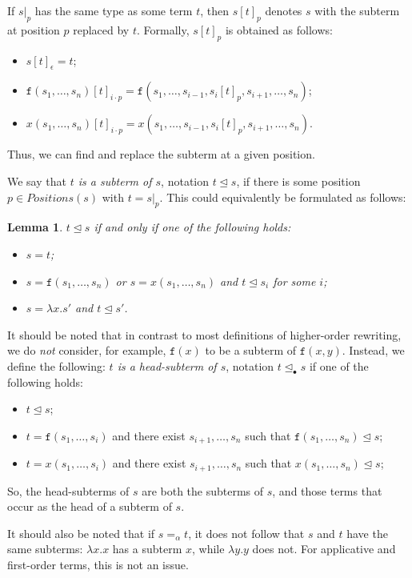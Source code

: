 \documentclass{lmcs}
\theoremstyle{theorem}\newtheorem{theorem}{Theorem}
\theoremstyle{theorem}\newtheorem{lemma}[theorem]{Lemma}
\theoremstyle{theorem}\newtheorem{corollary}[theorem]{Corollary}
\theoremstyle{definition}\newtheorem{definition}[theorem]{Definition}
\theoremstyle{definition}\newtheorem{example}[theorem]{Example}
\newcommand{\Positions}{\mathit{Positions}}
\newcommand{\identifier}[1]{\mathtt{#1}}
\newcommand{\afun}{\identifier{f}}
\newcommand{\avar}{x}
\newcommand{\abs}[2]{\lambda #1.#2}
\newcommand{\subtermeq}{\unlhd}
\newcommand{\headsubtermeq}{\unlhd_{\bullet}}
\begin{document}
If $s|_p$ has the same type as some term $t$, then $s[t]_p$ denotes $s$ with the subterm at position
$p$ replaced by $t$.  Formally, $s[t]_p$ is obtained as follows:
\begin{itemize}
\item $s[t]_\epsilon = t$;
\item $\afun(s_1,\dots,s_n)[t]_{i \cdot p} = \afun(s_1,\dots,s_{i-1},s_i[t]_p,s_{i+1},\dots,s_n)$;
\item $\avar(s_1,\dots,s_n)[t]_{i \cdot p} = \avar(s_1,\dots,s_{i-1},s_i[t]_p,s_{i+1},\dots,s_n)$.
\end{itemize}
Thus, we can find and replace the subterm at a given position.

We say that \emph{$t$ is a subterm of $s$}, notation $t \subtermeq s$, if there is some position
$p \in \Positions(s)$ with $t = s|_p$.  This could equivalently be formulated as follows:

\begin{lemma}
$t \subtermeq s$ if and only if one of the following holds:
\begin{itemize}
\item $s = t$;
\item $s = \afun(s_1,\dots,s_n)$ or $s = \avar(s_1,\dots,s_n)$ and $t \subtermeq s_i$ for some $i$;
\item $s = \abs{x}{s'}$ and $t \subtermeq s'$.
\end{itemize}
\end{lemma}

It should be noted that in contrast to most definitions of higher-order rewriting, we do \emph{not}
consider, for example, $\afun(x)$ to be a subterm of $\afun(x,y)$.  Instead, we define the
following: \emph{$t$ is a head-subterm of $s$}, notation $t \headsubtermeq s$ if one of the
following holds:
\begin{itemize}
\item $t \subtermeq s$;
\item $t = \afun(s_1,\dots,s_i)$ and there exist $s_{i+1},\dots,s_n$ such that
  $\afun(s_1,\dots,s_n) \subtermeq s$;
\item $t = \avar(s_1,\dots,s_i)$ and there exist $s_{i+1},\dots,s_n$ such that
  $\avar(s_1,\dots,s_n) \subtermeq s$;
\end{itemize}
So, the head-subterms of $s$ are both the subterms of $s$, and those terms that occur as the head
of a subterm of $s$.

It should also be noted that if $s =_\alpha t$, it does not follow that $s$ and $t$ have the same
subterms: $\abs{x}{x}$ has a subterm $x$, while $\abs{y}{y}$ does not.  For applicative and
first-order terms, this is not an issue.
\end{document}
